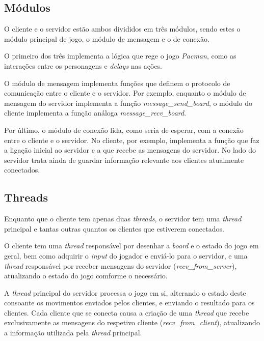 \documentclass[a4paper]{report}
\begin{document}
        \subsection{Módulos}
            \par O cliente e o servidor estão ambos divididos em três módulos, sendo estes o módulo principal de jogo, o módulo de mensagem e o de conexão. 
            \par O primeiro dos três implementa a lógica que rege o jogo \textit{Pacman}, como as interações entre os personagens e \textit{delays} nas ações.
            \par O módulo de mensagem implementa funções que definem o protocolo de comunicação entre o cliente e o servidor. Por exemplo, enquanto o módulo de mensagem do servidor implementa a função \textit{message\_send\_board}, o módulo do cliente implementa a função análoga \textit{message\_recv\_board}.
            \par Por último, o módulo de conexão lida, como seria de esperar, com a conexão entre o cliente e o servidor. No cliente, por exemplo, implementa a função que faz a ligação inicial ao servidor e a que recebe as mensagens do servidor. No lado do servidor trata ainda de guardar informação relevante aos clientes atualmente conectados.
        
        \subsection{Threads}
            \par Enquanto que o cliente tem apenas duas \textit{threads}, o servidor tem uma \textit{thread} principal e tantas outras quantos os clientes que estiverem conectados.
            \par O cliente tem uma \textit{thread} responsável por desenhar a \textit{board} e o estado do jogo em geral, bem como adquirir o \textit{input} do jogador e enviá-lo para o servidor, e uma \textit{thread} responsável por receber mensagens do servidor (\textit{recv\_from\_server}), atualizando o estado do jogo comforme o necessário.
            \par A \textit{thread} principal do servidor processa o jogo em si, alterando o estado deste consoante os movimentos enviados pelos clientes, e enviando o resultado para os clientes. Cada cliente que se conecta causa a criação de uma \textit{thread} que recebe exclusivamente as mensagens do respetivo cliente (\textit{recv\_from\_client}), atualizando a informação utilizada pela \textit{thread} principal.
\end{document}
